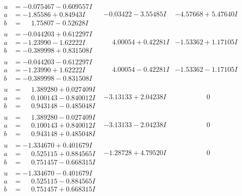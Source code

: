 \documentclass[1p]{elsarticle_modified}
\theoremstyle{definition}
\begin{document}
$$\begin{array}{c|c|c}
 \hline 
\begin{aligned}
u &= -0.075467 - 0.609557 I \\
a &= -1.85586 + 0.84943 I \\
b &= \phantom{-}1.75807 - 0.52628 I\end{aligned}
 & -0.03422 - 3.55485 I & -4.57668 + 5.47640 I \\ \hline\begin{aligned}
u &= -0.044203 + 0.612297 I \\
a &= -1.23990 - 1.62222 I \\
b &= -0.389998 + 0.831508 I\end{aligned}
 & \phantom{-}4.00054 + 0.42281 I & -1.53362 + 1.17105 I \\ \hline\begin{aligned}
u &= -0.044203 - 0.612297 I \\
a &= -1.23990 + 1.62222 I \\
b &= -0.389998 - 0.831508 I\end{aligned}
 & \phantom{-}4.00054 - 0.42281 I & -1.53362 - 1.17105 I \\ \hline\begin{aligned}
u &= \phantom{-}1.389280 + 0.027409 I \\
a &= \phantom{-}0.100143 - 0.840012 I \\
b &= \phantom{-}0.943148 - 0.485048 I\end{aligned}
 & -3.13133 + 2.04238 I & \phantom{-0.000000 } 0 \\ \hline\begin{aligned}
u &= \phantom{-}1.389280 - 0.027409 I \\
a &= \phantom{-}0.100143 + 0.840012 I \\
b &= \phantom{-}0.943148 + 0.485048 I\end{aligned}
 & -3.13133 - 2.04238 I & \phantom{-0.000000 } 0 \\ \hline\begin{aligned}
u &= -1.334670 + 0.401679 I \\
a &= \phantom{-}0.525115 + 0.884565 I \\
b &= \phantom{-}0.751457 - 0.668315 I\end{aligned}
 & -1.28728 + 4.79520 I & \phantom{-0.000000 } 0 \\ \hline\begin{aligned}
u &= -1.334670 - 0.401679 I \\
a &= \phantom{-}0.525115 - 0.884565 I \\
b &= \phantom{-}0.751457 + 0.668315 I\end{aligned}

\end{array}$$
\end{document}
